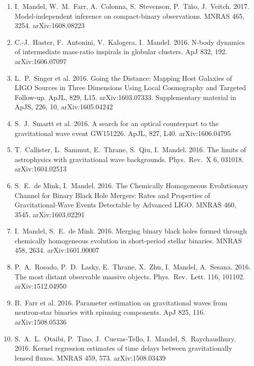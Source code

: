 \documentclass[margin,line]{res}
\begin{document}
\begin{resume}
\begin{enumerate}
\item I.~Mandel, W.~M.~Farr, A.~Colonna, S.~Stevenson, P.~Ti\v{n}o, J.~Veitch.  2017.  Model-independent inference on compact-binary observations.  MNRAS 465, 3254.  arXiv:1608.08223

\item C.-J.~Haster, F.~Antonini, V.~Kalogera, I.~Mandel. 2016. N-body dynamics of intermediate mass-ratio inspirals in globular clusters. ApJ 832, 192.  arXiv:1606.07097

\item L.~P.~Singer et al. 2016.  Going the Distance: Mapping Host Galaxies of LIGO Sources in Three Dimensions Using Local Cosmography and Targeted Follow-up.  ApJL, 829, L15. arXiv:1603.07333.   Supplementary material in ApJS, 226, 10, arXiv:1605.04242

\item S.~J.~Smartt et al.  2016.  A search for an optical counterpart to the gravitational wave event GW151226.  ApJL, 827, L40. arXiv:1606.04795

\item T.~Callister, L.~Sammut, E.~Thrane, S.~Qiu, I.~Mandel.  2016. The limits of astrophysics with gravitational wave backgrounds. Phys.~Rev.~X 6, 031018.  arXiv:1604.02513

\item S.~E.~de Mink, I.~Mandel. 2016. The Chemically Homogeneous Evolutionary Channel for Binary Black Hole Mergers: Rates and Properties of Gravitational-Wave Events Detectable by Advanced LIGO.  MNRAS 460, 3545.  arXiv:1603.02291

\item I.~Mandel, S.~E.~de Mink.  2016.  Merging binary black holes formed through chemically homogeneous evolution in short-period stellar binaries. MNRAS 458, 2634. arXiv:1601.00007

\item P.~A.~Rosado, P.~D.~Lasky, E.~Thrane, X.~Zhu, I.~Mandel, A.~Sesana.  2016. The most distant observable massive objects.  Phys.~Rev.~Lett. 116, 101102.  arXiv:1512.04950

\item B.~Farr et al. 2016. Parameter estimation on gravitational waves from neutron-star binaries with spinning components. ApJ 825, 116. arXiv:1508.05336

\item S.~A.~L.~Otaibi, P.~Tino, J.~Cuevas-Tello, I.~Mandel, S.~Raychaudhury.  2016.  Kernel regression estimates of time delays between gravitationally lensed fluxes.  MNRAS 459, 573.  arXiv:1508.03439


\end{enumerate}
\end{resume}
\end{document}
